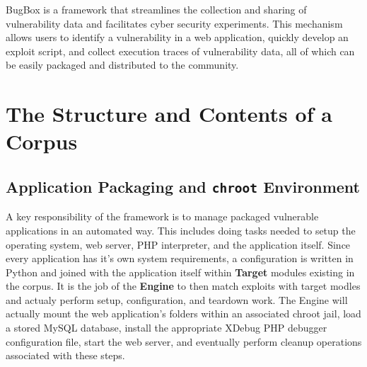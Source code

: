 \documentclass[letterpaper,twocolumn,10pt]{article}
\begin{document}
BugBox is a framework  that streamlines the collection and sharing of vulnerability data and facilitates cyber security experiments.  This mechanism allows users to identify a vulnerability in a web application, quickly develop an exploit script, and collect execution traces of vulnerability data, all of which can be easily packaged and distributed to the community.
 
\section {The Structure and Contents of a Corpus}

\subsection{Application Packaging and {\tt chroot} Environment}

A key responsibility of the framework is to manage packaged vulnerable applications in an automated way. This includes doing tasks needed to setup the operating system, web server, PHP interpreter, and the application itself. Since every application has it's own system requirements, a configuration is written in Python and joined with the application itself within {\bf Target} modules existing in the corpus. It is the job of the {\bf Engine} to then match exploits with target modles and actualy perform setup, configuration, and teardown work. The Engine will actually mount the web application's folders within an associated chroot jail, load a stored MySQL database, install the appropriate XDebug PHP debugger configuration file, start the web server, and eventually perform cleanup operations associated with these steps. \par
\end{document}

